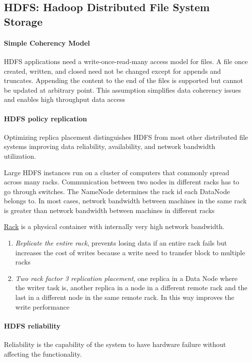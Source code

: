 \subsection{HDFS: Hadoop Distributed File System Storage}

\paragraph{Simple Coherency Model}
HDFS applications need a write-once-read-many access model for files. A file once created, written, and closed need not be changed except for appends and truncates. Appending the content to the end of the files is supported but cannot be updated at arbitrary point. This assumption simplifies data coherency issues and enables high throughput data access

\paragraph{HDFS policy replication}
Optimizing replica placement distinguishes HDFS from most other distributed file systems improving data reliability, availability, and network bandwidth utilization.

Large HDFS instances run on a cluster of computers that commonly spread across many racks. Communication between two nodes in different racks has to go through switches. The NameNode determines the rack id each DataNode belongs to. In most cases, network bandwidth between machines in the same rack is greater than network bandwidth between machines in different racks

\uline{Rack} is a physical container with internally very high network bandwidth.

\begin{enumerate}
    \item \textit{Replicate the entire rack}, prevents losing data if an entire rack fails but increases the cost of writes because a write need to transfer block to multiple racks
    \item \textit{Two rack factor 3 replication placement}, one replica in a Data Node where the writer task is, another replica in a node in a different remote rack and the last in a different node in the same remote rack. In this way improves the write performance
\end{enumerate}

\paragraph{HDFS reliability} 
Reliability is the capability of the system to have hardware failure without affecting the functionality.

